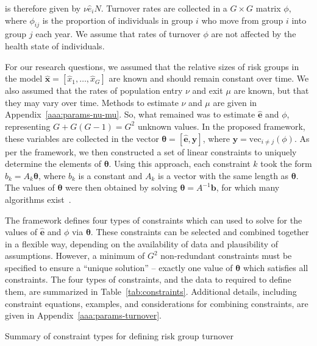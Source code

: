 is therefore given by $\nu \hat{e}_i N$.
Turnover rates are collected in a $G \times G$ matrix $\phi$,
where $\phi_{ij}$ is the proportion of individuals in group $i$
who move from group $i$ into group $j$ each year.
We assume that rates of turnover $\phi$
are not affected by the health state of individuals. 		%
\par
For our research questions,			
we assumed that the relative sizes of risk groups in the model	%
$\bm{\hat{x}} = [\hat{x}_1, \dots, \hat{x}_G]$
are known and should remain constant over time.
We also assumed that the rates of population entry $\nu$ and exit $\mu$
are known, but that they may vary over time.
Methods to estimate $\nu$ and $\mu$ are given in Appendix~\ref{aaa:params-nu-mu}.
So, what remained was to estimate $\bm{\hat{e}}$ and $\phi$,
representing $G + G(G-1) = G^2$ unknown values.
In the proposed framework,
these variables are collected in the vector
$\bm{\theta} = \left[\bm{\hat{e}}, \bm{y}\right]$,
where $\bm{y} = \mathrm{vec}_{i \ne j}(\phi)$.
As per the framework, we then constructed a set of linear constraints
to uniquely determine the elements of $\bm{\theta}$.
Using this approach, each constraint $k$ took the form
$b_k = A_k \bm{\theta}$,
where $b_k$ is a constant and $A_k$ is a vector with the same length as $\bm{\theta}$.
The values of $\bm{\theta}$ were then obtained by solving
$\bm{\theta} = A^{-1}\bm{b}$,
for which many algorithms exist~\citep{LAPACK}.
\par
The framework defines four types of constraints which can used to
solve for the values of $\bm{\hat{e}}$ and $\phi$ via $\bm{\theta}$.
These constraints can be selected and combined together in a flexible way,
depending on the availability of data and plausibility of assumptions.
However, a minimum of $G^2$ non-redundant constraints must be specified
to ensure a ``unique solution''
-- exactly one value of $\bm{\theta}$ which satisfies all constraints.
The four types of constraints, and the data to required to define them,
are summarized in Table~\ref{tab:constraints}.
Additional details, including
constraint equations, examples, and considerations for combining constraints,
are given in Appendix~\ref{aaa:params-turnover}.%
\begin{table}
  \centering
  \caption{Summary of constraint types for defining risk group turnover}
  \label{tab:constraints}
  
\end{table}
